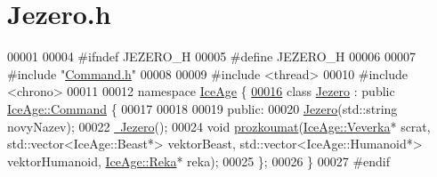 \hypertarget{Jezero_8h_source}{}\section{Jezero.\+h}
\label{Jezero_8h_source}

\begin{DoxyCode}
00001 
00004 \textcolor{preprocessor}{#ifndef JEZERO\_H}
00005 \textcolor{preprocessor}{#define JEZERO\_H}
00006 
00007 \textcolor{preprocessor}{#include "\hyperlink{Command_8h}{Command.h}"}
00008 
00009 \textcolor{preprocessor}{#include <thread>}
00010 \textcolor{preprocessor}{#include <chrono>}
00011 
00012 \textcolor{keyword}{namespace }\hyperlink{namespaceIceAge}{IceAge} \{
\hypertarget{Jezero_8h_source.tex_l00016}{}\hyperlink{classIceAge_1_1Jezero}{00016}     \textcolor{keyword}{class }\hyperlink{classIceAge_1_1Jezero}{Jezero} : \textcolor{keyword}{public} \hyperlink{classIceAge_1_1Command}{IceAge::Command} \{
00017 
00018 
00019     \textcolor{keyword}{public}:
00020         \hyperlink{classIceAge_1_1Jezero_aef3e83dcf70348c374349b8c515471d9}{Jezero}(std::string novyNazev);
00022         \hyperlink{classIceAge_1_1Jezero_ac0a6358ddc8d39f5d5c3220cf80658ae}{~Jezero}();
00024         \textcolor{keywordtype}{void} \hyperlink{classIceAge_1_1Jezero_ae105afa2b2e2c50e5b899181e6170949}{prozkoumat}(\hyperlink{classIceAge_1_1Veverka}{IceAge::Veverka}* scrat, std::vector<IceAge::Beast*> 
      vektorBeast, std::vector<IceAge::Humanoid*> vektorHumanoid, \hyperlink{classIceAge_1_1Reka}{IceAge::Reka}* reka);
00025     \};
00026 \}
00027 \textcolor{preprocessor}{#endif}
\end{DoxyCode}

